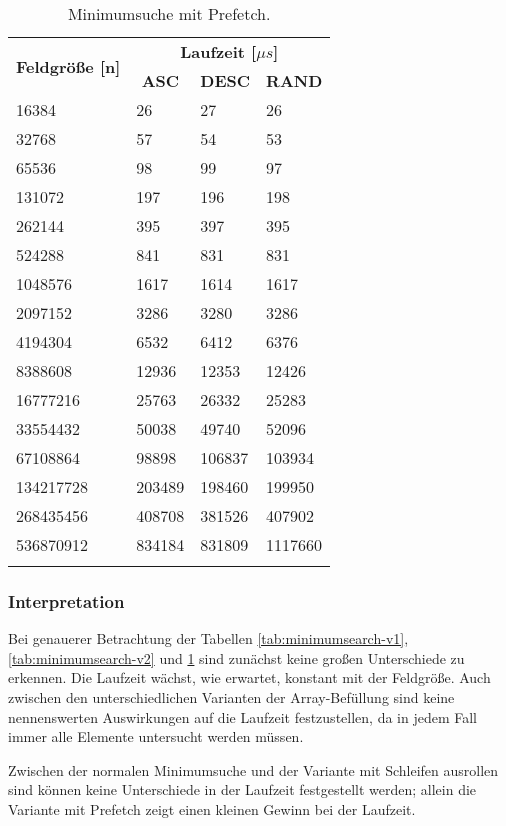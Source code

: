 \begin{center}
	\begin{longtable}{|p{5cm}|p{3cm}|p{3cm}|p{3cm}|}
		\hline
		
		\multirow{2}{5cm}{\centering \textbf{Feldgröße [n]}} & \multicolumn{3}{|c|}{ \textbf{Laufzeit [$\mu s$]}} \\\cline{2-4}
		& \multicolumn{1}{|c|}{\textbf{ASC}} & \multicolumn{1}{|c|}{\textbf{DESC}} &\multicolumn{1}{|c|}{\textbf{RAND}} \\
		\hhline{|=|=|=|=|}
		
		16384 & 26 & 27 & 26\\
		\hline
		32768 & 57 & 54 & 53\\
		\hline
		65536 & 98 & 99 & 97\\
		\hline
		131072 & 197 & 196 & 198\\
		\hline
		262144 & 395 & 397 & 395\\
		\hline
		524288 & 841 & 831 & 831\\
		\hline
		1048576 & 1617 & 1614 & 1617\\
		\hline
		2097152 & 3286 & 3280 & 3286\\
		\hline
		4194304 & 6532 & 6412 & 6376\\
		\hline
		8388608 & 12936 & 12353 & 12426\\
		\hline
		16777216 & 25763 & 26332 & 25283\\
		\hline
		33554432 & 50038 & 49740 & 52096\\
		\hline
		67108864 & 98898 & 106837 & 103934\\
		\hline
		134217728 & 203489 & 198460 & 199950\\
		\hline
		268435456 & 408708 & 381526 & 407902\\
		\hline
		536870912 & 834184 & 831809 & 1117660\\
		\hline
		
		\caption{Minimumsuche mit Prefetch.}
		\label{tab:minimumsearch-v3}
	\end{longtable}
\end{center}

\subsubsection{Interpretation}

Bei genauerer Betrachtung der Tabellen \ref{tab:minimumsearch-v1}, \ref{tab:minimumsearch-v2} und \ref{tab:minimumsearch-v3} sind zunächst keine großen Unterschiede zu erkennen. Die Laufzeit wächst, wie erwartet, konstant mit der Feldgröße. Auch zwischen den unterschiedlichen Varianten der Array-Befüllung sind keine nennenswerten Auswirkungen auf die Laufzeit festzustellen, da in jedem Fall immer alle Elemente untersucht werden müssen.

Zwischen der normalen Minimumsuche und der Variante mit Schleifen ausrollen sind können keine Unterschiede in der Laufzeit festgestellt werden; allein die Variante mit Prefetch zeigt einen kleinen Gewinn bei der Laufzeit.
